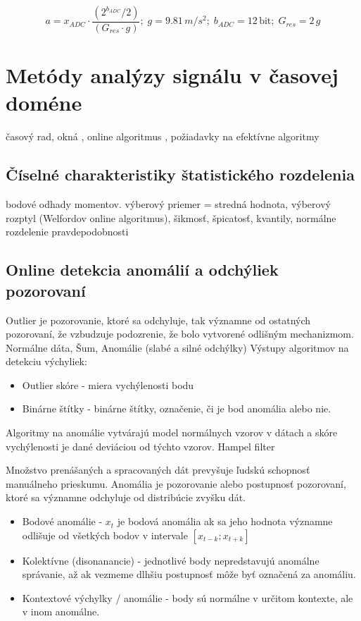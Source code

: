 \begin{equation}
a = x_{ADC} \cdot \frac{(2^{b_{ADC}} / 2)}{(G_{res} \cdot g)};\; g = 9.81\,m/s^2;\; b_{ADC} = 12\,\mathrm{bit};\; G_{res} = 2\,g
\end{equation}

\section{Metódy analýzy signálu v časovej doméne}
časový rad, okná
\cite{time-series-analysis} \cite{practical-time-series} \cite{generalized-esd} \cite{twitter-esd}, 
online algoritmus \cite{online-anomaly-detection}, 
požiadavky na efektívne algoritmy
	

\subsection{Číselné charakteristiky štatistického rozdelenia}
bodové odhady momentov. výberový priemer = stredná hodnota, výberový rozptyl (Welfordov online algoritmus), šikmosť, špicatosť, kvantily, normálne rozdelenie pravdepodobnosti

\subsection{Online detekcia anomálií a odchýliek pozorovaní}
Outlier je pozorovanie, ktoré sa odchyluje, tak významne od ostatných pozorovaní, že vzbudzuje
podozrenie, že bolo vytvorené odlišným mechanizmom. Normálne dáta, Šum, Anomálie (slabé a silné odchýlky)
Výstupy algoritmov na detekciu výchyliek: 
\begin{itemize}
\itemsep0pt
\item Outlier skóre - miera vychýlenosti bodu
\item Binárne štítky - binárne štítky, označenie, či je bod anomália alebo nie.
\end{itemize}
Algoritmy na anomálie vytvárajú model normálnych vzorov v dátach a skóre vychýlenosti je dané deviáciou od týchto vzorov.
\cite{outlier-analysis} 
Hampel filter

\cite{survey-univariate-time-series} 
Množstvo prenášaných a spracovaných dát prevyšuje ľudskú schopnosť manuálneho prieskumu. Anomália je pozorovanie alebo postupnosť pozorovaní, ktoré sa významne odchyluje od distribúcie zvyšku dát. 
\begin{itemize}
	\item Bodové anomálie - $x_t$ je bodová anomália ak sa jeho hodnota významne odlišuje od všetkých 		
		bodov v intervale $ [x_{t-k}; x_{t+k}] $
	\item Kolektívne (disonanancie) - jednotlivé body nepredstavujú anomálne správanie, až ak vezmeme dlhšiu postupnosť môže byť označená za anomáliu.
	\item Kontextové výchylky / anomálie - body sú normálne v určitom kontexte, ale v inom anomálne.
\end{itemize}		

